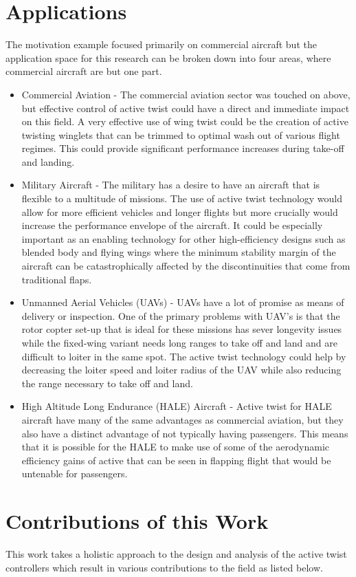 \documentclass[11pt]{ucthesis}
\begin{document}
\section{Applications}
\label{sec:applications}
The motivation example focused primarily on commercial aircraft but the application space for this research can be broken down into four areas, where commercial aircraft are but one part.
\begin{itemize}
\item Commercial Aviation - The commercial aviation sector was touched on above, but effective control of active twist could have a direct and immediate impact on this field. A very effective use of wing twist could be the creation of active twisting winglets that can be trimmed to optimal wash out of various flight regimes. This could provide significant performance increases during take-off and landing.
\item Military Aircraft - The military has a desire to have an aircraft that is flexible to a multitude of missions. The use of active twist technology would allow for more efficient vehicles and longer flights but more crucially would increase the performance envelope of the aircraft. It could be especially important as an enabling technology for other high-efficiency designs such as blended body and flying wings where the minimum stability margin of the aircraft can be catastrophically affected by the discontinuities that come from traditional flaps.
\item Unmanned Aerial Vehicles (UAVs) - UAVs have a lot of promise as means of delivery or inspection. One of the primary problems with UAV's is that the rotor copter set-up that is ideal for these missions has sever longevity issues while the fixed-wing variant needs long ranges to take off and land and are difficult to loiter in the same spot. The active twist technology could help by decreasing the loiter speed and loiter radius of the UAV while also reducing the range necessary to take off and land.
\item High Altitude Long Endurance (HALE) Aircraft - Active twist for HALE aircraft have many of the same advantages as commercial aviation, but they also have a distinct advantage of not typically having passengers. This means that it is possible for the HALE to make use of some of the aerodynamic efficiency gains of active that can be seen in flapping flight that would be untenable for passengers.
\end{itemize}

\section{Contributions of this Work}
This work takes a holistic approach to the design and analysis of the active twist controllers which result in various contributions to the field as listed below.
\end{document}

